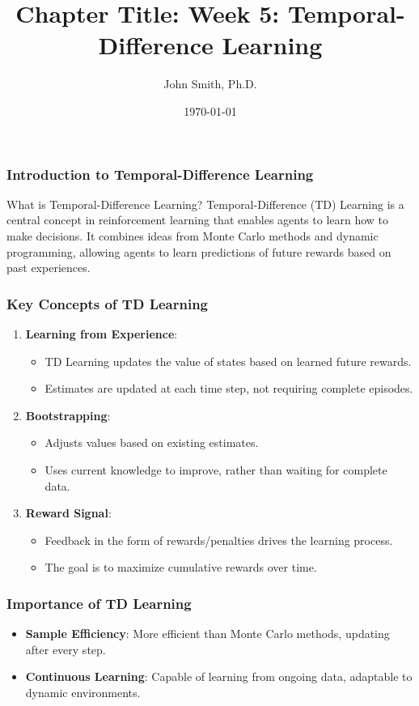 \documentclass[aspectratio=169]{beamer}
\title[Week 5: Temporal-Difference Learning]{Chapter Title: Week 5: Temporal-Difference Learning}
\author[J. Smith]{John Smith, Ph.D.}
\institute[University Name]{
  Department of Computer Science\\
  University Name\\
  \vspace{0.3cm}
  Email: email@university.edu\\
  Website: www.university.edu
}
\date{\today}
\begin{document}
\frame{\titlepage}

\begin{frame}[fragile]
    \frametitle{Introduction to Temporal-Difference Learning}
    \begin{block}{What is Temporal-Difference Learning?}
        Temporal-Difference (TD) Learning is a central concept in reinforcement learning that enables agents to learn how to make decisions. It combines ideas from Monte Carlo methods and dynamic programming, allowing agents to learn predictions of future rewards based on past experiences.
    \end{block}
\end{frame}

\begin{frame}[fragile]
    \frametitle{Key Concepts of TD Learning}
    \begin{enumerate}
        \item \textbf{Learning from Experience}:
            \begin{itemize}
                \item TD Learning updates the value of states based on learned future rewards.
                \item Estimates are updated at each time step, not requiring complete episodes.
            \end{itemize}
        
        \item \textbf{Bootstrapping}:
            \begin{itemize}
                \item Adjusts values based on existing estimates.
                \item Uses current knowledge to improve, rather than waiting for complete data.
            \end{itemize}
        
        \item \textbf{Reward Signal}:
            \begin{itemize}
                \item Feedback in the form of rewards/penalties drives the learning process.
                \item The goal is to maximize cumulative rewards over time.
            \end{itemize}
    \end{enumerate}
\end{frame}

\begin{frame}[fragile]
    \frametitle{Importance of TD Learning}
    \begin{itemize}
        \item \textbf{Sample Efficiency}: More efficient than Monte Carlo methods, updating after every step.
        \item \textbf{Continuous Learning}: Capable of learning from ongoing data, adaptable to dynamic environments.
    \end{itemize}
\end{frame}
\end{document}
